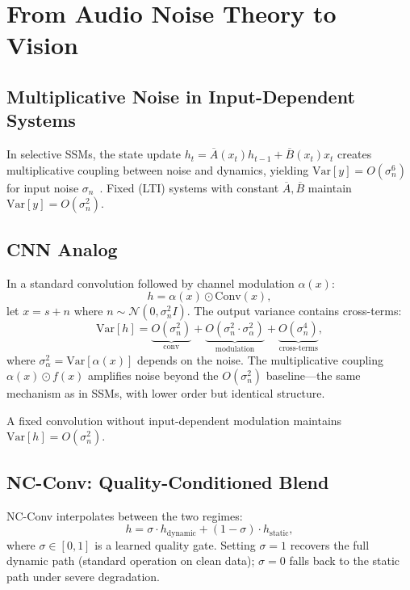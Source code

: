 \documentclass{bmvc2k}
\begin{document}
\section{From Audio Noise Theory to Vision}
\label{sec:theory}

\subsection{Multiplicative Noise in Input-Dependent Systems}

In selective SSMs, the state update $h_t = \overline{A}(x_t) h_{t-1} + \overline{B}(x_t) x_t$ creates multiplicative coupling between noise and dynamics, yielding $\text{Var}[y] = O(\sigma_n^6)$ for input noise $\sigma_n$~\cite{choi2026ncssm}.
Fixed (LTI) systems with constant $\overline{A}, \overline{B}$ maintain $\text{Var}[y] = O(\sigma_n^2)$.

\subsection{CNN Analog}

In a standard convolution followed by channel modulation $\alpha(x)$:
\begin{equation}
h = \alpha(x) \odot \text{Conv}(x),
\end{equation}
let $x = s + n$ where $n \sim \mathcal{N}(0, \sigma_n^2 I)$.
The output variance contains cross-terms:
\begin{equation}
\text{Var}[h] = \underbrace{O(\sigma_n^2)}_{\text{conv}} + \underbrace{O(\sigma_n^{2} \cdot \sigma_\alpha^2)}_{\text{modulation}} + \underbrace{O(\sigma_n^4)}_{\text{cross-terms}},
\end{equation}
where $\sigma_\alpha^2 = \text{Var}[\alpha(x)]$ depends on the noise.
The multiplicative coupling $\alpha(x) \odot f(x)$ amplifies noise beyond the $O(\sigma_n^2)$ baseline---the same mechanism as in SSMs, with lower order but identical structure.

A fixed convolution without input-dependent modulation maintains $\text{Var}[h] = O(\sigma_n^2)$.

\subsection{NC-Conv: Quality-Conditioned Blend}

NC-Conv interpolates between the two regimes:
\begin{equation}
h = \sigma \cdot h_{\text{dynamic}} + (1 - \sigma) \cdot h_{\text{static}},
\label{eq:nc_blend}
\end{equation}
where $\sigma \in [0, 1]$ is a learned quality gate.
Setting $\sigma = 1$ recovers the full dynamic path (standard operation on clean data); $\sigma = 0$ falls back to the static path under severe degradation.
\end{document}
